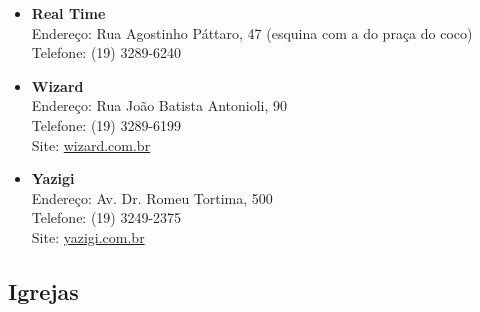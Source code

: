 \begin{itemize}
\item   \textbf{Real Time}
		\\Endereço: Rua Agostinho Páttaro, 47 (esquina com a do praça do coco)
		\\Telefone: (19) 3289-6240

\item   \textbf{Wizard}
		\\Endereço: Rua João Batista Antonioli, 90
		\\Telefone: (19) 3289-6199
		\\Site: \url{wizard.com.br}

\item   \textbf{Yazigi}
		\\Endereço: Av. Dr. Romeu Tortima, 500
		\\Telefone: (19) 3249-2375
		\\Site: \url{yazigi.com.br}
\end{itemize}

\subsection{Igrejas}

